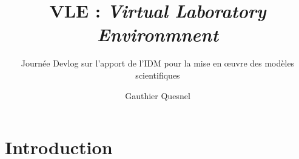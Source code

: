 \documentclass[xetex, compress, table, dvipsnames]{beamer}
\title[VLE]{VLE : \emph{Virtual Laboratory Environmnent}}
\subtitle[]{Journée Devlog sur l'apport de l'IDM pour la mise en œuvre
des modèles scientifiques}
\author[Quesnel \emph{et al.}]{Gauthier Quesnel}
\institute[INRA MIA MIAT]{INRA - MIAT}
\date{}
\begin{document}
\begin{frame}
  \titlepage
\end{frame}

\section{Introduction}

\end{document}
